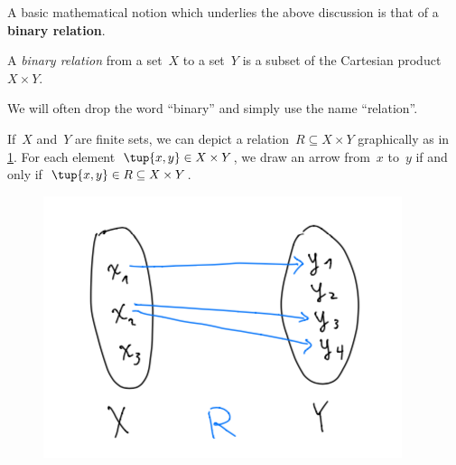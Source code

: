 A basic mathematical notion which underlies the above discussion is that of a \textbf{binary relation}. 

\begin{definition}
A \emph{binary relation} from a set~$X$ to a set~$Y$ is a subset of the Cartesian product $X\times Y$. 
\end{definition}

\begin{remark}
We will often drop the word ``binary'' and simply use the name ``relation''.  
\end{remark}

If~$X$ and~$Y$ are finite sets, we can depict a relation~$R \subseteq X \times Y$ graphically as in \cref{fig:example_rel}. For each element~$\tup{x,y} \in X \times Y$, we draw an arrow from~$x$ to~$y$ if and only if~$\tup{x,y} \in R \subseteq X \times Y$. 

\begin{figure}[h!]
\centering
 \includegraphics[width=0.5\linewidth]{pics/dist_net_7.png}
 \caption{}
\label{fig:example_rel}
\end{figure}

\begin{center}
\end{center}

